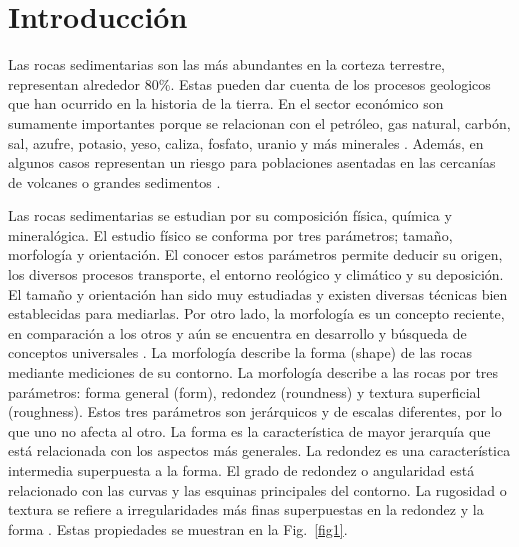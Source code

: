 \documentclass[conference]{IEEEtran}
\begin{document}
\IEEEpeerreviewmaketitle



\section{Introducción}
Las rocas sedimentarias son las más abundantes en la corteza terrestre, representan alrededor 80\%. Estas pueden dar cuenta de los procesos geologicos que han ocurrido en la historia de la tierra. En el sector económico son sumamente importantes porque se relacionan con el petróleo, gas natural, carbón, sal, azufre, potasio, yeso, caliza, fosfato, uranio y más minerales \cite{b2}. Además, en algunos casos representan un riesgo para poblaciones asentadas en las cercanías de volcanes o grandes sedimentos \cite{b3}. 

Las rocas sedimentarias se estudian por su composición física, química  y mineralógica. El estudio físico se conforma por tres parámetros; tamaño, morfología y orientación. El conocer estos parámetros permite deducir su origen, los diversos procesos transporte, el entorno reológico y climático y su deposición. El tamaño y orientación han sido muy estudiadas y existen diversas técnicas bien establecidas para mediarlas\cite{b4}. Por otro lado, la morfología es un concepto reciente, en comparación a los otros y aún se encuentra en desarrollo y búsqueda de conceptos universales \cite{b5}. La morfología describe la forma (shape) de las rocas mediante mediciones de su contorno. La morfología describe a las rocas por tres parámetros: forma general (form), redondez (roundness) y textura superficial (roughness). Estos tres parámetros son jerárquicos y de escalas diferentes, por lo que uno no afecta al otro. La forma es la característica de mayor jerarquía que está relacionada con los aspectos más generales. La redondez es una característica intermedia superpuesta a la forma. El grado de redondez o angularidad está relacionado con las curvas y las esquinas principales del contorno. La rugosidad o textura se refiere a irregularidades más finas superpuestas en la redondez y la forma \cite{b6}. Estas propiedades se muestran en la Fig.~\ref{fig1}.
\end{document}
